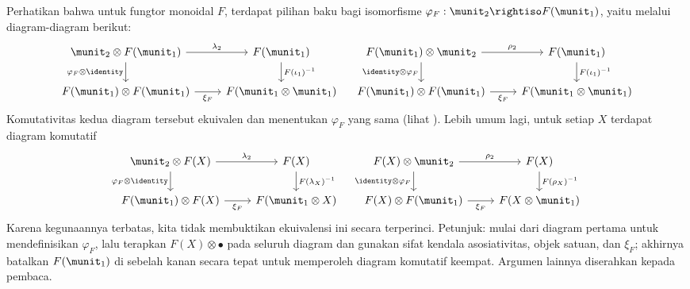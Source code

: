 Perhatikan bahwa untuk fungtor monoidal $F$, terdapat pilihan baku bagi isomorfisme $\varphi_F: \munit_2 \rightiso F(\munit_1)$, yaitu melalui diagram-diagram berikut:
\begin{equation} \begin{tikzcd}
	\munit_2 \otimes F(\munit_1) \arrow[r, "{\lambda_2}"] \arrow[d, "{\varphi_F \otimes \identity}"'] & F(\munit_1) \arrow[d, "{F(\iota_1)^{-1}}"] \\
	F(\munit_1) \otimes F(\munit_1) \arrow[r, "{\xi_F}"'] & F(\munit_1 \otimes \munit_1)
\end{tikzcd} \quad
\begin{tikzcd}
	F(\munit_1) \otimes \munit_2  \arrow[r, "{\rho_2}"] \arrow[d, "{\identity \otimes \varphi_F}"'] & F(\munit_1) \arrow[d, "{F(\iota_1)^{-1}}"] \\
	F(\munit_1) \otimes F(\munit_1) \arrow[r, "{\xi_F}"'] & F(\munit_1 \otimes \munit_1)
\end{tikzcd} \end{equation}
Komutativitas kedua diagram tersebut ekuivalen dan menentukan $\varphi_F$ yang sama (lihat \cite[Proposition 2.4.3]{EGNO15}). Lebih umum lagi, untuk setiap $X$ terdapat diagram komutatif
\begin{equation}\label{eqn:monoidal-functor-units} \begin{tikzcd}
	\munit_2 \otimes F(X) \arrow[r, "{\lambda_2}"] \arrow[d, "{\varphi_F \otimes \identity}"'] & F(X) \arrow[d, "{F(\lambda_X)^{-1}}"] \\
	F(\munit_1) \otimes F(X) \arrow[r, "{\xi_F}"'] & F(\munit_1 \otimes X)
\end{tikzcd} \quad
\begin{tikzcd}
	F(X) \otimes \munit_2 \arrow[r, "{\rho_2}"] \arrow[d, "{\identity \otimes \varphi_F}"'] & F(X) \arrow[d, "{F(\rho_X)^{-1}}"] \\
	F(X) \otimes F(\munit_1) \arrow[r, "{\xi_F}"'] & F(X \otimes \munit_1)
\end{tikzcd} \end{equation}
Karena kegunaannya terbatas, kita tidak membuktikan ekuivalensi ini secara terperinci. Petunjuk: mulai dari diagram pertama untuk mendefinisikan $\varphi_F$, lalu terapkan $F(X) \otimes \bullet$ pada seluruh diagram dan gunakan sifat kendala asosiativitas, objek satuan, dan $\xi_F$; akhirnya batalkan $F(\munit_1)$ di sebelah kanan secara tepat untuk memperoleh diagram komutatif keempat. Argumen lainnya diserahkan kepada pembaca.

